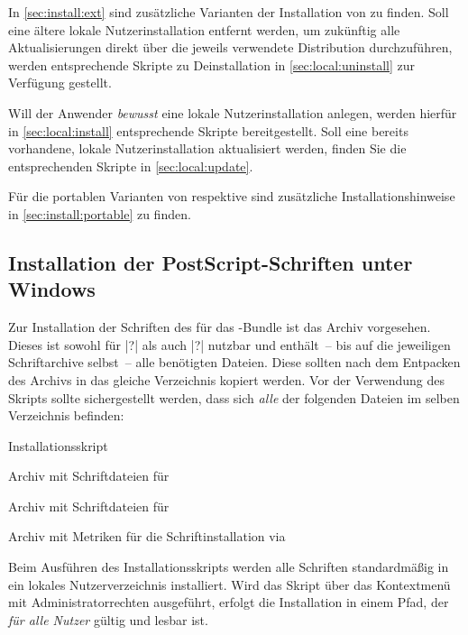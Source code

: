 In \autoref{sec:install:ext} sind zusätzliche Varianten der Installation von 
\TUDScript zu finden. Soll eine ältere lokale Nutzerinstallation entfernt 
werden, um zukünftig alle Aktualisierungen direkt über die jeweils verwendete 
Distribution durchzuführen, werden entsprechende Skripte zu Deinstallation in 
\autoref{sec:local:uninstall} zur Verfügung gestellt.

Will der Anwender \emph{bewusst} eine lokale Nutzerinstallation anlegen, werden 
hierfür in \autoref{sec:local:install} entsprechende Skripte bereitgestellt. 
Soll eine bereits vorhandene, lokale Nutzerinstallation aktualisiert werden, 
finden Sie die entsprechenden Skripte in \autoref{sec:local:update}.

Für die portablen Varianten von 
respektive  sind zusätzliche 
Installationshinweise in \autoref{sec:install:portable} zu finden.


\subsection{Installation der PostScript-Schriften unter Windows}
%
%
Zur Installation der Schriften des \CDs für das \TUDScript-Bundle ist das Archiv
vorgesehen. Dieses ist sowohl für |?| als auch
|?| nutzbar und enthält~-- bis auf die jeweiligen 
Schriftarchive selbst~-- alle benötigten Dateien. Diese sollten nach dem 
Entpacken des Archivs in das gleiche Verzeichnis kopiert werden. Vor der 
Verwendung des Skripts  sollte sichergestellt 
werden, dass sich \emph{alle} der folgenden Dateien im selben Verzeichnis 
befinden:
%
\settowidth{}%
\begin{description}[labelwidth=\tempdim,labelsep=1em]
  \item[\File{tudscrfonts\_install.bat}]Installationsskript
  \item[\File{Univers\_PS.zip}]Archiv mit Schriftdateien für \Univers
  \item[\File{DIN\_Bd\_PS.zip}]Archiv mit Schriftdateien für \DIN
  \item[\File{tudscr\_fonts\_install.zip}]Archiv mit Metriken für die
    Schriftinstallation via 
\end{description}
%
Beim Ausführen des Installationsskripts werden alle Schriften standardmäßig in 
ein lokales Nutzerverzeichnis installiert. Wird das Skript über das Kontextmenü 
mit Administratorrechten ausgeführt, erfolgt die Installation in einem Pfad, 
der \emph{für alle Nutzer} gültig und lesbar ist.



